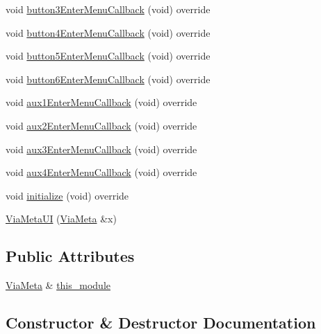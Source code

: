 \begin{DoxyCompactItemize}
\item 
void \mbox{\hyperlink{class_via_meta_1_1_via_meta_u_i_abff70e527b92121c207699c8c8334ee6}{button3\+Enter\+Menu\+Callback}} (void) override
\item 
void \mbox{\hyperlink{class_via_meta_1_1_via_meta_u_i_aef07210c32f8147e6b5ab92b923347e9}{button4\+Enter\+Menu\+Callback}} (void) override
\item 
void \mbox{\hyperlink{class_via_meta_1_1_via_meta_u_i_af14bee3824185ab5a97d8745e9317370}{button5\+Enter\+Menu\+Callback}} (void) override
\item 
void \mbox{\hyperlink{class_via_meta_1_1_via_meta_u_i_a5bcffdfe679b51dbcac0e78dc093c29b}{button6\+Enter\+Menu\+Callback}} (void) override
\item 
void \mbox{\hyperlink{class_via_meta_1_1_via_meta_u_i_a84e9b3d83d81753db095d67dee1fe8b9}{aux1\+Enter\+Menu\+Callback}} (void) override
\item 
void \mbox{\hyperlink{class_via_meta_1_1_via_meta_u_i_a31e89fca82851581b9ad7161cd81c6c0}{aux2\+Enter\+Menu\+Callback}} (void) override
\item 
void \mbox{\hyperlink{class_via_meta_1_1_via_meta_u_i_a31f9a7e08ee2d77d7aa96b644369e92d}{aux3\+Enter\+Menu\+Callback}} (void) override
\item 
void \mbox{\hyperlink{class_via_meta_1_1_via_meta_u_i_aa6309c2403a8436cc3ec222f7914b202}{aux4\+Enter\+Menu\+Callback}} (void) override
\item 
void \mbox{\hyperlink{class_via_meta_1_1_via_meta_u_i_ac2bc1bfeb6ef0045d234bd5b89f9ec99}{initialize}} (void) override
\item 
\mbox{\hyperlink{class_via_meta_1_1_via_meta_u_i_aa99917558f8467b7658347f461326add}{Via\+Meta\+UI}} (\mbox{\hyperlink{class_via_meta}{Via\+Meta}} \&x)
\end{DoxyCompactItemize}
\subsection*{Public Attributes}
\begin{DoxyCompactItemize}
\item 
\mbox{\hyperlink{class_via_meta}{Via\+Meta}} \& \mbox{\hyperlink{class_via_meta_1_1_via_meta_u_i_a8798ab0a875a443e05fc0954d849742c}{this\+\_\+module}}
\end{DoxyCompactItemize}


\subsection{Constructor \& Destructor Documentation}
\mbox{\label{class_via_meta_1_1_via_meta_u_i_aa99917558f8467b7658347f461326add}} 
